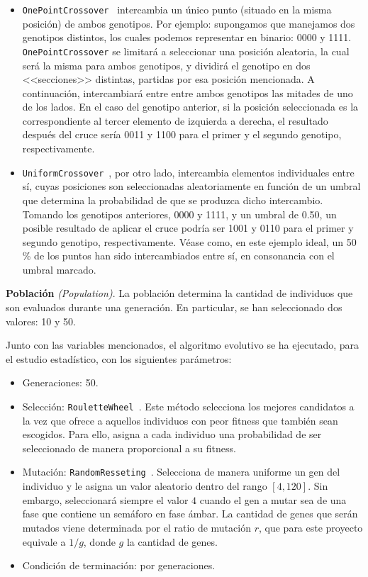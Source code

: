 \begin{itemize}
    \item \texttt{OnePointCrossover}~\cite{eiben_422_2003} intercambia un único punto (situado en la misma posición) de ambos genotipos. Por ejemplo: supongamos que manejamos dos genotipos distintos, los cuales podemos representar en binario: 0000 y 1111. \texttt{OnePointCrossover} se limitará a seleccionar una posición aleatoria, la cual será la misma para ambos genotipos, y dividirá el genotipo en dos <<secciones>> distintas, partidas por esa posición mencionada. A continuación, intercambiará entre entre ambos genotipos las mitades de uno de los lados. En el caso del genotipo anterior, si la posición seleccionada es la correspondiente al tercer elemento de izquierda a derecha, el resultado después del cruce sería 0011 y 1100 para el primer y el segundo genotipo, respectivamente.
    \item \texttt{UniformCrossover}~\cite{eiben_422_2003}, por otro lado, intercambia elementos individuales entre sí, cuyas posiciones son seleccionadas aleatoriamente en función de un umbral que determina la probabilidad de que se produzca dicho intercambio. Tomando los genotipos anteriores, 0000 y 1111, y un umbral de 0.50, un posible resultado de aplicar el cruce podría ser 1001 y 0110 para el primer y segundo genotipo, respectivamente. Véase como, en este ejemplo ideal, un 50 \% de los puntos han sido intercambiados entre sí, en consonancia con el umbral marcado.
\end{itemize}


\textbf{Población} \textit{(Population)}. La población determina la cantidad de individuos que son evaluados durante una generación. En particular, se han seleccionado dos valores: 10 y 50.

Junto con las variables mencionados, el algoritmo evolutivo se ha ejecutado, para el estudio estadístico, con los siguientes parámetros:

\begin{itemize}
    \item Generaciones: 50. 
    \item Selección: \texttt{RouletteWheel}~\cite{lipowski_roulette-wheel_2012}. Este método selecciona los mejores candidatos a la vez que ofrece a aquellos individuos con peor fitness que también sean escogidos. Para ello, asigna a cada individuo una probabilidad de ser seleccionado de manera proporcional a su fitness.
    \item Mutación: \texttt{RandomResseting}~\cite{abrante_dorta_framework_2019}. Selecciona de manera uniforme un gen del individuo y le asigna un valor aleatorio dentro del rango $[4,120]$. Sin embargo, seleccionará siempre el valor $4$ cuando el gen a mutar sea de una fase que contiene un semáforo en fase ámbar. La cantidad de genes que serán mutados viene determinada por el ratio de mutación $r$, que para este proyecto equivale a $1 / g$, donde $g$ la cantidad de genes.
    \item Condición de terminación: por generaciones.
\end{itemize}


